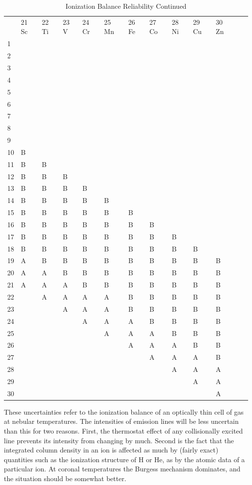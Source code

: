 \begin{table}
\caption{Ionization Balance Reliability Continued}
\begin{tabular}{lllllllllllll}
\hline
&21 Sc&22 Ti&23 V&24 Cr&25 Mn&26 Fe&27 Co&28 Ni&29 Cu&30
Zn&\\
1\\
2\\
3\\
4\\
5\\
6\\
7\\
8\\
9\\
10&B\\
11&B&B\\
12&B&B&B&\\
13&B&B&B&B\\
14&B&B&B&B&B\\
15&B&B&B&B&B&B\\
16&B&B&B&B&B&B&B\\
17&B&B&B&B&B&B&B&B\\
18&B&B&B&B&B&B&B&B&B\\
19&A&B&B&B&B&B&B&B&B&B\\
20&A&A&B&B&B&B&B&B&B&B\\
21&A&A&A&B&B&B&B&B&B&B\\
22&&A&A&A&A&B&B&B&B&B\\
23&&&A&A&A&B&B&B&B&B\\
24&&&&A&A&A&B&B&B&B\\
25&&&&&A&A&A&B&B&B\\
26&&&&&&A&A&A&B&B\\
27&&&&&&&A&A&A&B\\
28&&&&&&&&A&A&A\\
29&&&&&&&&&A&A\\
30&&&&&&&&&&A\\
\hline
\end{tabular}
\end{table}

These uncertainties refer to the ionization balance of an optically thin
cell of gas at nebular temperatures.  The intensities of emission lines
will be less uncertain than this for two reasons. First, the thermostat
effect of any collisionally excited line prevents its intensity from changing
by much.  Second is the fact that the integrated column density in an ion
is affected as much by (fairly exact) quantities such as the ionization
structure of H or He, as by the atomic data of a particular ion.  At coronal
temperatures the Burgess mechanism dominates, and the situation should be
somewhat better.

